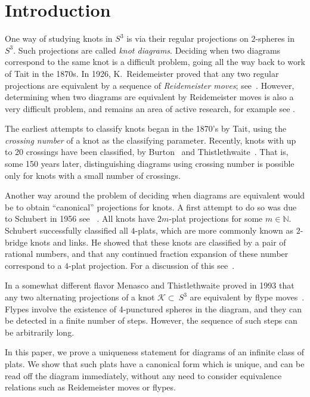 \documentclass[12pt,reqno]{amsart}
\theoremstyle{plain}
\theoremstyle{definition}
\begin{document}
\section{Introduction}\label{sec:Introduction}

One way of studying knots in $S^3$ is via their regular projections on
$2$-spheres in $S^3$.  Such projections are called \emph{knot
 diagrams}. Deciding when two diagrams correspond to the same knot is
a difficult problem, going all the way back to work of Tait in the
1870s. In 1926, K.~Reidemeister proved that any two regular
projections are equivalent by a sequence of \emph{Reidemeister moves};
see~\cite{Rei}. However, determining when two diagrams are equivalent
by Reidemeister moves is also a very difficult problem, and remains an
area of active research, for example see \cite{lackenby:reidemeister,
coward-lackenby}.

The earliest attempts to classify knots began in the 1870's by Tait,
using the \emph{crossing number} of a knot as the classifying
parameter. Recently, knots with up to 20 crossings have been classified, 
by Burton~\cite{Burton:19} and Thistlethwaite~\cite{Thistlethwaite:20}. 
That is, some 150 years later, distinguishing diagrams using crossing number is
possible only for knots with a small number of crossings.

Another way around the problem of deciding when diagrams are
equivalent would be to obtain ``canonical'' projections for knots. A
first attempt to do so was due to Schubert in 1956 see ~\cite{Schu}. 
All knots have $2m$-plat projections for some $m \in \mathbb{N}$.  
Schubert successfully classified all $4$-plats, which are more commonly known
as $2$-bridge knots and links. He showed that these
knots are classified by a pair of rational numbers, and that any continued
fraction expansion of these number correspond to a $4$-plat
projection. For a discussion of this see~\cite{BleilerMoriah}.

In a somewhat different flavor Menasco and Thistlethwaite proved
in 1993 that any two alternating projections of a knot
$\mathcal{K}\subset~S^3$ are equivalent by flype
moves~\cite{MT}. Flypes involve the existence of 4-punctured
spheres in the diagram, and they can be detected in a finite number of
steps. However, the sequence of such steps can be arbitrarily long.

In this paper, we prove a uniqueness statement for diagrams of an
infinite class of plats. We show that such plats have a canonical 
form which is unique, and can be read off the diagram immediately, 
without any need to consider equivalence relations such as Reidemeister 
moves or flypes. 
\end{document}
